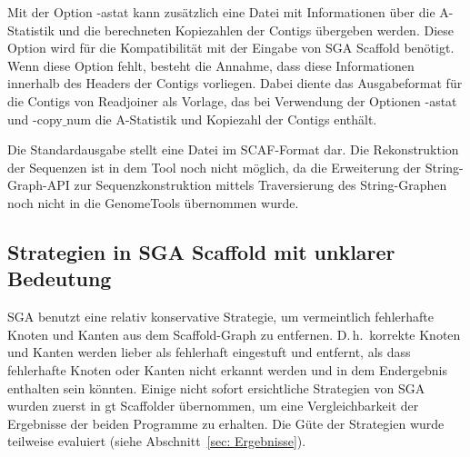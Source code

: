 \documentclass[a4paper,11pt,parskip]{scrartcl}
\begin{document}
Mit der Option -astat kann zusätzlich eine Datei mit Informationen
über die A-Statistik und die berechneten Kopiezahlen der Contigs
übergeben werden. Diese Option wird für die Kompatibilität mit der
Eingabe von SGA Scaffold benötigt. Wenn diese Option fehlt, besteht die
Annahme, dass diese Informationen innerhalb des Headers der
Contigs vorliegen. Dabei diente das Ausgabeformat für die Contigs von
Readjoiner als Vorlage, das bei Verwendung der Optionen -astat und
-copy$\_$num die A-Statistik und Kopiezahl der Contigs enthält.

Die Standardausgabe stellt eine Datei im SCAF-Format dar. Die
Rekonstruktion der Sequenzen ist in dem Tool noch nicht möglich, da
die Erweiterung der String-Graph-API zur Sequenzkonstruktion mittels
Traversierung des String-Graphen noch nicht in die GenomeTools
übernommen wurde.

\subsection{Strategien in SGA Scaffold mit unklarer Bedeutung}
\label{sec: wunderlich}
SGA benutzt eine relativ konservative Strategie, um vermeintlich
fehlerhafte Knoten und Kanten aus dem Scaffold-Graph zu
entfernen. D.\,h.\ korrekte Knoten und Kanten werden lieber als
fehlerhaft eingestuft und entfernt, als dass fehlerhafte Knoten oder
Kanten nicht erkannt werden und in dem Endergebnis enthalten sein
könnten. Einige nicht sofort ersichtliche Strategien von SGA wurden
zuerst in gt Scaffolder übernommen, um eine Vergleichbarkeit der
Ergebnisse der beiden Programme zu erhalten. Die Güte der Strategien
wurde teilweise evaluiert (siehe Abschnitt~\ref{sec: Ergebnisse}).
\end{document}
